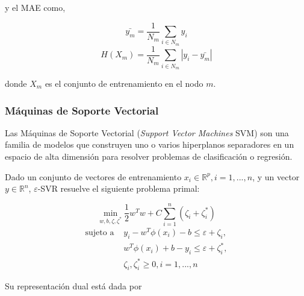 \documentclass[spanish]{article}
\begin{document}
                y el MAE como,
                
                \begin{equation}
                    \bar{y_m} = \frac{1}{N_m} \sum_{i \in N_m} y_i
                \end{equation}
                \begin{equation}
                    H(X_m) = \frac{1}{N_m} \sum_{i \in N_m} |y_i - \bar{y_m}|
                \end{equation}
                
                donde $X_m$ es el conjunto de entrenamiento en el nodo $m$.
                            
            \subsubsection{Máquinas de Soporte Vectorial}
            
                Las Máquinas de Soporte Vectorial (\emph{Support Vector Machines} SVM) son una familia de modelos que construyen uno o varios hiperplanos
                separadores en un espacio de alta dimensión para resolver problemas de clasificación o regresión. 
                
                Dado un conjunto de vectores de entrenamiento $x_i \in \mathbb{R}^p, i=1, ..., n$, y un vector $y \in \mathbb{R}^n$, $\varepsilon$-SVR 
                resuelve el siguiente problema primal:
                
                \begin{equation}
                    \min_ {w, b, \zeta, \zeta^*} \frac{1}{2} w^T w + C \sum_{i=1}^{n} (\zeta_i + \zeta_i^*) 
                    \nonumber
                \end{equation}
                \begin{equation}
                    \begin{split}
                        \textrm {sujeto a } & y_i - w^T \phi (x_i) - b \leq \varepsilon + \zeta_i,\\
                          & w^T \phi (x_i) + b - y_i \leq \varepsilon + \zeta_i^*,\\
                          & \zeta_i, \zeta_i^* \geq 0, i=1, ..., n
                    \end{split}
                \end{equation}
    
                Su representación dual está dada por
                
\end{document}
